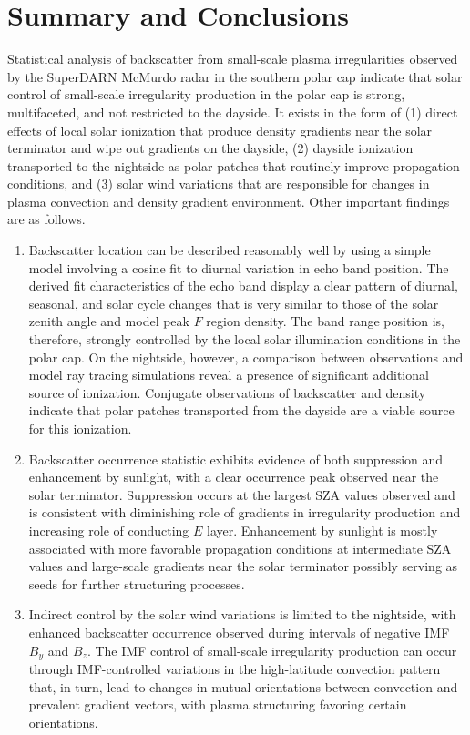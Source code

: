 \section{Summary and Conclusions}
\label{sec:p1conclusions}

Statistical analysis of backscatter from small-scale plasma irregularities observed by the SuperDARN McMurdo radar in the southern polar cap indicate that solar control of small-scale irregularity production in the polar cap is strong, multifaceted, and not restricted to the dayside. It exists in the form of (1) direct effects of local solar ionization that produce density gradients near the solar terminator and wipe out gradients on the dayside, (2) dayside ionization transported to the nightside as polar patches that routinely improve propagation conditions, and (3) solar wind variations that are responsible for changes in plasma convection and density gradient environment. Other important findings are as follows.

\begin{enumerate}
	\item Backscatter location can be described reasonably well by using a simple model involving a cosine fit to diurnal variation in echo band position. The derived fit characteristics of the echo band display a clear pattern of diurnal, seasonal, and solar cycle changes that is very similar to those of the solar zenith angle and model peak \(F\) region density. The band range position is, therefore, strongly controlled by the local solar illumination conditions in the polar cap. On the nightside, however, a comparison between observations and model ray tracing simulations reveal a presence of significant additional source of ionization. Conjugate observations of backscatter and density indicate that polar patches transported from the dayside are a viable source for this ionization.
	\item Backscatter occurrence statistic exhibits evidence of both suppression and enhancement by sunlight, with a clear occurrence peak observed near the solar terminator. Suppression occurs at the largest SZA values observed and is consistent with diminishing role of gradients in irregularity production and increasing role of conducting \(E\) layer. Enhancement by sunlight is mostly associated with more favorable propagation conditions at intermediate SZA values and large-scale gradients near the solar terminator possibly serving as seeds for further structuring processes.
	\item Indirect control by the solar wind variations is limited to the nightside, with enhanced backscatter occurrence observed during intervals of negative IMF \(B_y\) and \(B_z\). The IMF control of small-scale irregularity production can occur through IMF-controlled variations in the high-latitude convection pattern that, in turn, lead to changes in mutual orientations between convection and prevalent gradient vectors, with plasma structuring favoring certain orientations.
\end{enumerate}


